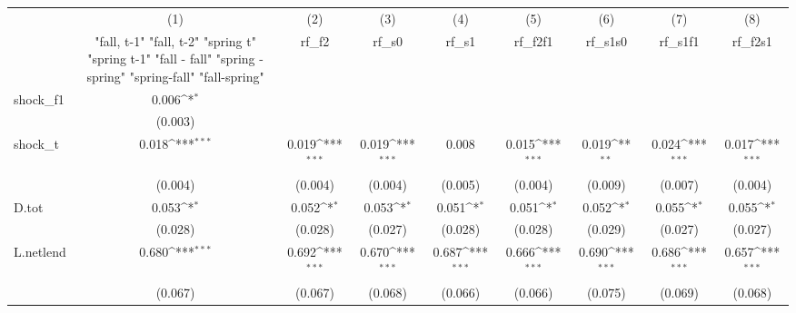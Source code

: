 {
\def\sym#1{\ifmmode^{#1}\else\(^{#1}\)\fi}
\begin{tabular}{l*{8}{c}}
\toprule
            &\multicolumn{1}{c}{(1)}&\multicolumn{1}{c}{(2)}&\multicolumn{1}{c}{(3)}&\multicolumn{1}{c}{(4)}&\multicolumn{1}{c}{(5)}&\multicolumn{1}{c}{(6)}&\multicolumn{1}{c}{(7)}&\multicolumn{1}{c}{(8)}\\
            &\multicolumn{1}{c}{  "fall, t-1" "fall, t-2" "spring t" "spring t-1"  "fall - fall" "spring - spring" "spring-fall" "fall-spring" }&\multicolumn{1}{c}{rf\_f2}&\multicolumn{1}{c}{rf\_s0}&\multicolumn{1}{c}{rf\_s1}&\multicolumn{1}{c}{rf\_f2f1}&\multicolumn{1}{c}{rf\_s1s0}&\multicolumn{1}{c}{rf\_s1f1}&\multicolumn{1}{c}{rf\_f2s1}\\
\midrule
shock\_f1    &       0.006\sym{*}  &                     &                     &                     &                     &                     &                     &                     \\
            &     (0.003)         &                     &                     &                     &                     &                     &                     &                     \\
\addlinespace
shock\_t     &       0.018\sym{***}&       0.019\sym{***}&       0.019\sym{***}&       0.008         &       0.015\sym{***}&       0.019\sym{**} &       0.024\sym{***}&       0.017\sym{***}\\
            &     (0.004)         &     (0.004)         &     (0.004)         &     (0.005)         &     (0.004)         &     (0.009)         &     (0.007)         &     (0.004)         \\
\addlinespace
D.tot       &       0.053\sym{*}  &       0.052\sym{*}  &       0.053\sym{*}  &       0.051\sym{*}  &       0.051\sym{*}  &       0.052\sym{*}  &       0.055\sym{*}  &       0.055\sym{*}  \\
            &     (0.028)         &     (0.028)         &     (0.027)         &     (0.028)         &     (0.028)         &     (0.029)         &     (0.027)         &     (0.027)         \\
\addlinespace
L.netlend   &       0.680\sym{***}&       0.692\sym{***}&       0.670\sym{***}&       0.687\sym{***}&       0.666\sym{***}&       0.690\sym{***}&       0.686\sym{***}&       0.657\sym{***}\\
            &     (0.067)         &     (0.067)         &     (0.068)         &     (0.066)         &     (0.066)         &     (0.075)         &     (0.069)         &     (0.068)         \\

\end{tabular}}
